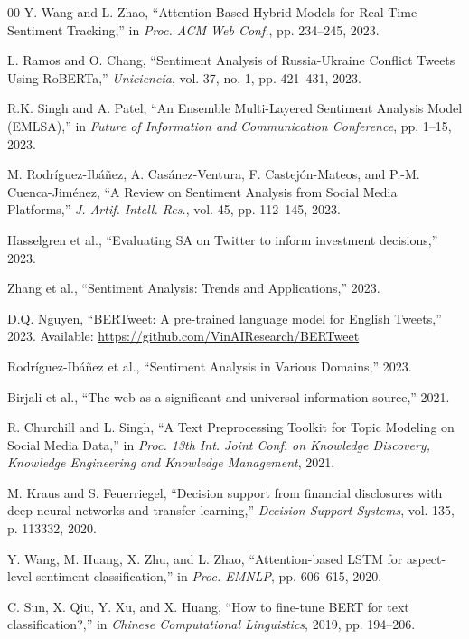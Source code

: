 \documentclass[conference]{IEEEtran}
\begin{document}
\begin{thebibliography}{00}
Y. Wang and L. Zhao, 
``Attention-Based Hybrid Models for Real-Time Sentiment Tracking,'' 
in \textit{Proc. ACM Web Conf.}, pp. 234--245, 2023.

L. Ramos and O. Chang, 
``Sentiment Analysis of Russia-Ukraine Conflict Tweets Using RoBERTa,'' 
\textit{Uniciencia}, vol. 37, no. 1, pp. 421--431, 2023.

R.K. Singh and A. Patel, 
``An Ensemble Multi-Layered Sentiment Analysis Model (EMLSA),'' 
in \textit{Future of Information and Communication Conference}, pp. 1--15, 2023.

M. Rodríguez-Ibáñez, A. Casánez-Ventura, F. Castejón-Mateos, and P.-M. Cuenca-Jiménez, 
``A Review on Sentiment Analysis from Social Media Platforms,'' 
\textit{J. Artif. Intell. Res.}, vol. 45, pp. 112--145, 2023.

Hasselgren et al., 
``Evaluating SA on Twitter to inform investment decisions,'' 
2023.

Zhang et al., 
``Sentiment Analysis: Trends and Applications,'' 
2023.

D.Q. Nguyen, 
``BERTweet: A pre-trained language model for English Tweets,'' 
2023. Available: \url{https://github.com/VinAIResearch/BERTweet}

Rodríguez-Ibáñez et al., 
``Sentiment Analysis in Various Domains,'' 
2023.

Birjali et al., 
``The web as a significant and universal information source,'' 
2021.

R. Churchill and L. Singh, 
``A Text Preprocessing Toolkit for Topic Modeling on Social Media Data,'' 
in \textit{Proc. 13th Int. Joint Conf. on Knowledge Discovery, Knowledge Engineering and Knowledge Management}, 2021.

M. Kraus and S. Feuerriegel, 
``Decision support from financial disclosures with deep neural networks and transfer learning,'' 
\textit{Decision Support Systems}, vol. 135, p. 113332, 2020.

Y. Wang, M. Huang, X. Zhu, and L. Zhao, 
``Attention-based LSTM for aspect-level sentiment classification,'' 
in \textit{Proc. EMNLP}, pp. 606--615, 2020.

C. Sun, X. Qiu, Y. Xu, and X. Huang, 
``How to fine-tune BERT for text classification?,'' 
in \textit{Chinese Computational Linguistics}, 2019, pp. 194--206.


\end{thebibliography}
\end{document}
